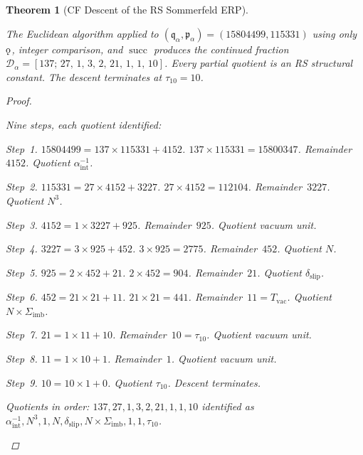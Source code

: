 \documentclass[11pt,letterpaper]{article}
\theoremstyle{plain}
\newtheorem{theorem}{Theorem}[section]
\theoremstyle{definition}
\theoremstyle{remark}
\renewcommand{\succ}{\operatorname{succ}}
\newcommand{\koppa}{\mathbin{\text{\rm\k{o}}}}
\newcommand{\Sigimb}{\Sigma_{\mathrm{imb}}}
\newcommand{\dslip}{\delta_{\mathrm{slip}}}
\newcommand{\Tvac}{T_{\mathrm{vac}}}
\newcommand{\tauX}{\tau_{10}}
\newcommand{\aSC}{\alpha^{-1}_{\mathrm{int}}}
\newcommand{\pa}{\mathfrak{p}_\alpha}
\newcommand{\qa}{\mathfrak{q}_\alpha}
\newcommand{\Da}{\mathcal{D}_\alpha}
\begin{document}
\begin{theorem}[CF Descent of the RS Sommerfeld
ERP]\label{thm:sommerfeld-descent}
\begin{rsbox}
The Euclidean algorithm applied to $(\qa,\pa)=(15804499,115331)$
using only $\koppa$, integer comparison, and $\succ$ produces the
continued fraction $\Da=[137;\,27,\,1,\,3,\,2,\,21,\,1,\,1,\,10]$.
Every partial quotient is an RS structural constant.  The descent
terminates at $\tauX=10$.
\end{rsbox}
\begin{proof}
\begin{rsbox}
Nine steps, each quotient identified:

\textit{Step~1.} $15804499=137\times115331+4152$.
$137\times115331=15800347$. Remainder~$4152$. Quotient $\aSC$.

\textit{Step~2.} $115331=27\times4152+3227$.
$27\times4152=112104$. Remainder~$3227$. Quotient $N^3$.

\textit{Step~3.} $4152=1\times3227+925$.
Remainder~$925$. Quotient vacuum unit.

\textit{Step~4.} $3227=3\times925+452$.
$3\times925=2775$. Remainder~$452$. Quotient $N$.

\textit{Step~5.} $925=2\times452+21$.
$2\times452=904$. Remainder~$21$. Quotient $\dslip$.

\textit{Step~6.} $452=21\times21+11$.
$21\times21=441$. Remainder~$11=\Tvac$. Quotient $N\times\Sigimb$.

\textit{Step~7.} $21=1\times11+10$.
Remainder~$10=\tauX$. Quotient vacuum unit.

\textit{Step~8.} $11=1\times10+1$.
Remainder~$1$. Quotient vacuum unit.

\textit{Step~9.} $10=10\times1+0$.
Quotient $\tauX$. Descent terminates.

Quotients in order: $137,27,1,3,2,21,1,1,10$ identified as
$\aSC,N^3,1,N,\dslip,N\times\Sigimb,1,1,\tauX$.
\end{rsbox}
\end{proof}
\end{theorem}
\end{document}
